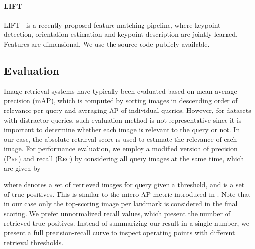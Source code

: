 \documentclass[10pt,twocolumn,letterpaper]{article}
\begin{document}
\vspace{-10pt}
\paragraph{LIFT} 
LIFT~\cite{yi2016lift} is a recently proposed feature matching pipeline, where keypoint detection, orientation estimation and keypoint description are jointly learned.  
Features are  dimensional. 
We use the source code publicly available.



\subsection{Evaluation} 
\label{sub:metrics}
Image retrieval systems have typically been evaluated based on mean average precision (mAP), which is computed by sorting images in descending order of relevance per query and averaging AP of individual queries.
However, for datasets with distractor queries, such evaluation method is not representative since it is important to determine whether each image is relevant to the query or not.
In our case, the absolute retrieval score is used to estimate the relevance of each image.
For performance evaluation, we employ a modified version of precision (\textsc{Pre}) and recall (\textsc{Rec}) by considering all query images at the same time, which are given by 

where  denotes a set of retrieved images for query  given a threshold, and  is a set of true positives.
This is similar to the micro-AP metric introduced in \cite{perronnin2009}.
Note that in our case only the top-scoring image per landmark is considered in the final scoring.
We prefer unnormalized recall values, which present the number of retrieved true positives.
Instead of summarizing our result in a single number, we present a full precision-recall curve to inspect operating points with different retrieval thresholds.
\end{document}
